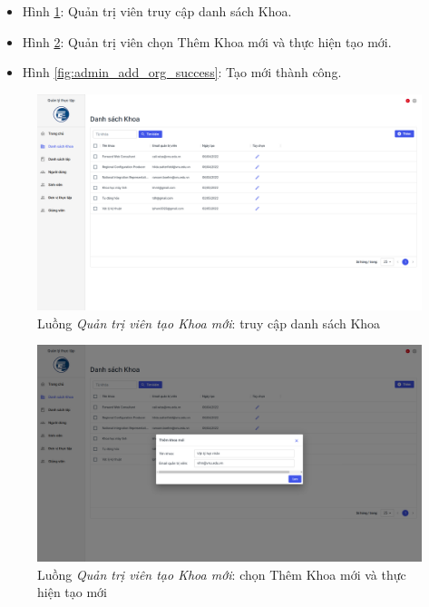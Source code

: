 \documentclass[./../main.tex]{subfiles}
\begin{document}
\begin{itemize}
	\item Hình \ref{fig:admin_access_list_orgs}: Quản trị viên truy cập danh sách Khoa. 
	\item Hình \ref{fig:admin_add_org}: Quản trị viên chọn Thêm Khoa mới và thực hiện tạo mới.
	\item Hình \ref{fig:admin_add_org_success}: Tạo mới thành công.
\end{itemize}

\begin{figure}[]
	\includegraphics[width=\linewidth]{./images/image56.png}
	\caption{Luồng \emph{Quản trị viên tạo Khoa mới}: truy cập danh sách Khoa}
	\label{fig:admin_access_list_orgs}
\end{figure}

\begin{figure}[]
	\includegraphics[width=\linewidth]{./images/image57.png}
	\caption{Luồng \emph{Quản trị viên tạo Khoa mới}: chọn Thêm Khoa mới và thực hiện tạo mới}
	\label{fig:admin_add_org}
\end{figure}
\end{document}
